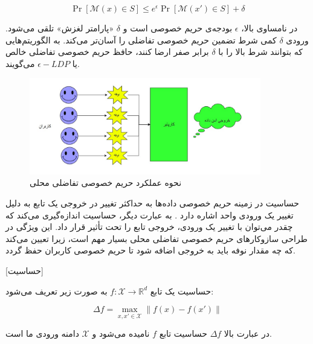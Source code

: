 \begin{equation}
\Pr[\mathcal{M}(x) \in S] \leq e^\epsilon \Pr[\mathcal{M}(x') \in S] + \delta
\end{equation}


در نامساوی بالا، $\epsilon$ بودجه‌ی حریم خصوصی است و $\delta$ «پارامتر لغزش» تلقی می‌شود. ورودی $\delta$ کمی شرط تضمین حریم خصوصی تفاضلی را آسان‌تر می‌کند. به الگوریتم‌هایی که بتوانند شرط بالا را با $\delta$ برابر صفر ارضا کنند، حافظ حریم خصوصی تفاضلی خالص یا $\epsilon{-}LDP$ می‌گویند.

\begin{figure}[h]
  \centering
  \includegraphics[width=0.9\textwidth]{figs/LDP.jpg}
  \caption{نحوه عملکرد حریم خصوصی تفاضلی محلی}
  \label{fig:LDP}
\end{figure}



حساسیت در زمینه حریم خصوصی داده‌ها به حداکثر تغییر در خروجی یک تابع به دلیل تغییر یک ورودی واحد اشاره دارد . به عبارت دیگر، حساسیت اندازه‌گیری می‌کند که چقدر می‌توان با تغییر یک ورودی، خروجی تابع را تحت تأثیر قرار داد. این ویژگی در طراحی سازوکار‌های حریم خصوصی تفاضلی محلی بسیار مهم است، زیرا تعیین می‌کند که چه مقدار نوفه باید به خروجی اضافه شود تا حریم خصوصی کاربران حفظ گردد.

[حساسیت]

حساسیت یک تابع $ f : \mathcal{X} \to \mathbb{R}^d$ به صورت زیر تعریف می‌شود:

\begin{equation}
\Delta f = \max_{x, x' \in \mathcal{X}} \|f(x) - f(x')\|
\end{equation}



در عبارت بالا $\Delta f$ حساسیت تابع $f$ نامیده می‌شود و $\mathcal{X}$ دامنه ورودی ما است.


